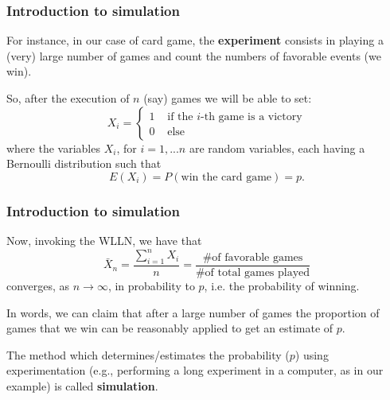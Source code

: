 \documentclass[notes=show,smaller,handout]{beamer}\usepackage[]{graphicx}\usepackage[]{color}
\begin{document}
\begin{frame}
\frametitle{Introduction to simulation}

For instance,  in our case of card game, the \textbf{experiment} consists in playing a (very) large number of games and count the numbers of favorable events (we win).

\vspace{0.4cm}

So, after the execution of $n$ (say) games we will be able to set:
$$
X_i = \left\{\begin{array}{ll}
1& \mbox{ if the $i$-th game is a victory}\\
0 & \mbox{ else}
\end{array}\right.
$$
where the variables $X_i$, for $i=1,...n$ are random variables, each having a Bernoulli distribution such that
$$
E(X_i) = P(\text{win the card game}) = p.
$$

\end{frame}


\begin{frame}
\frametitle{Introduction to simulation}
Now, invoking the WLLN, we have that
$$
\bar{X}_n = \frac{\sum_{i=1}^n X_i}{n} = \frac{\text{\# of favorable games}}{\text{\# of total games played}}
$$
converges, as $n \to \infty$, in probability to $p$, i.e. the probability of winning. \pause \\

\vspace{0.4cm}

In words, we can claim that after a large number of games the proportion
of games that we win can be reasonably applied to get an estimate of $p$.
\vspace{0.4cm}

\begin{definition}
The method which determines/estimates the probability ($p$) using experimentation (e.g., performing a long experiment in a computer, as in our example) is called \textbf{simulation}.
\end{definition}


\end{frame}
\end{document}
